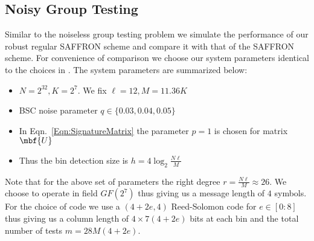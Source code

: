 \documentclass[conference,twocolumn]{IEEEtran}
\newcommand*{\MyPath}{../../bib}
\begin{document}
\subsection*{Noisy Group Testing}
Similar to the noiseless group testing problem we simulate the performance of our robust regular SAFFRON scheme and compare it with that of the SAFFRON scheme. For convenience of comparison we choose our system parameters identical to the choices in \cite{lee2015saffron}. The system parameters are summarized below:
\begin{itemize}
\item $N=2^{32}, K=2^7$. We fix $\ell=12, M=11.36K$
\item BSC noise parameter $q\in\{0.03,0.04,0.05\}$
\item In Eqn.~\ref{Eqn:SignatureMatrix} the parameter $p=1$ is chosen for matrix $\mbf{U}$
\item Thus the bin detection size is $h=4\log_2 \frac{N\ell}{M}$
\end{itemize}
Note that for the above set of parameters the right degree $r=\frac{N\ell}{M}\approx 26$. We choose to operate in field $GF(2^7)$ thus giving us a message length of $4$ symbols. For the choice of code we use a $(4+2e,4)$ Reed-Solomon code for $e\in[0:8]$ thus giving us a column length of $4\times 7(4+2e)$ bits at each bin and the total number of tests $m=28M(4+2e)$.



\end{document}
